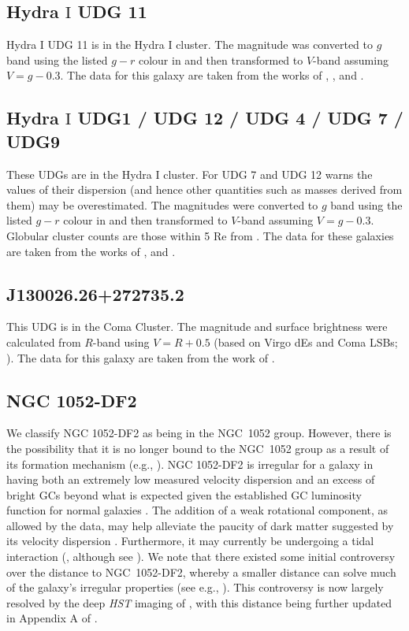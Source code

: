 \subsection{Hydra $\mathrm{I}$ UDG 11}
Hydra $\mathrm{I}$ UDG 11 is in the Hydra $\mathrm{I}$ cluster. The magnitude was converted to $g$ band using the listed $g-r$ colour in \citet{Iodice2020} and then transformed to $V$-band assuming $V = g-0.3$. The data for this galaxy are taken from the works of \citet{Iodice2020}, \citet{Iodice2023}, \citet{Buttitta2025} and \citet{Doll2026}.

\subsection{Hydra $\mathrm{I}$ UDG1 / UDG 12 / UDG 4 / UDG 7 / UDG9}
These UDGs are in the Hydra $\mathrm{I}$ cluster. For UDG 7 and UDG 12 \citet{Butitta2025} warns the values of their dispersion (and hence other quantities such as masses derived from them) may be overestimated. The magnitudes were converted to $g$ band using the listed $g-r$ colour in \citet{Iodice2020} and then transformed to $V$-band assuming $V = g-0.3$. Globular cluster counts are those within 5 Re from \citet{Iodice2020}. The data for these galaxies are taken from the works of \citet{Iodice2020}, \citet{Buttitta2025} and \citet{Doll2026}.

\subsection{J130026.26+272735.2}
This UDG is in the Coma Cluster. The magnitude and surface brightness were calculated from $R$-band using $V=R+0.5$ (based on Virgo dEs and Coma LSBs; \citealp{vanZee2004, Alabi2020}). The data for this galaxy are taken from the work of \citet{Chilingarian2019}.

\subsection{NGC 1052-DF2}
We classify NGC 1052-DF2 as being in the NGC~1052 group. However, there is the possibility that it is no longer bound to the NGC~1052 group as a result of its formation mechanism (e.g., \citealp{Shen2021, vanDokkum2022}). NGC 1052-DF2 is irregular for a galaxy in having both an extremely low measured velocity dispersion \citep{vanDokkum2018, Danieli2019} and an excess of bright GCs beyond what is expected given the established GC luminosity function for normal galaxies \citep{vanDokkum2018b, Shen2021}. The addition of a weak rotational component, as allowed by the data, may help alleviate the paucity of dark matter suggested by its velocity dispersion \citep{Emsellem2019, Lewis2020, Montes2021}. Furthermore, it may currently be undergoing a tidal interaction (\citealp{Keim2021}, although see \citealp{Montes2021, Golini2024}). We note that there existed some initial controversy over the distance to NGC~1052-DF2, whereby a smaller distance can solve much of the galaxy's irregular properties (see e.g., \citealp{Trujillo2019, Monelli2019}). This controversy is now largely resolved by the deep \textit{HST} imaging of \citet{Shen2021}, with this distance being further updated in Appendix A of \citet{Shen2023}.


